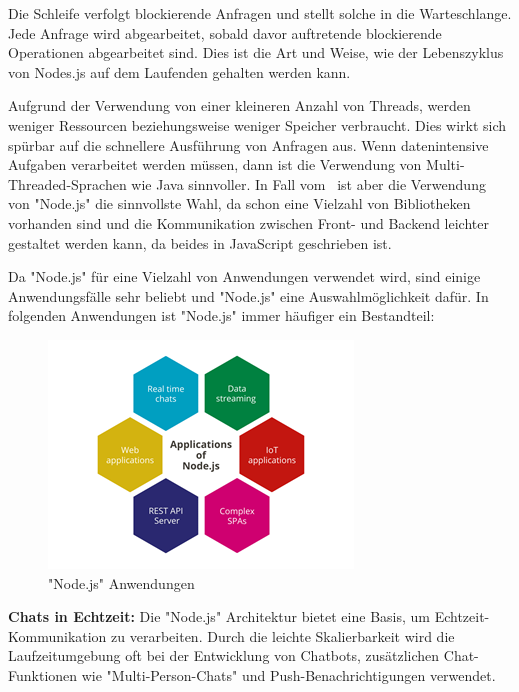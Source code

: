 Die Schleife verfolgt blockierende Anfragen und stellt solche in die Warteschlange. Jede Anfrage wird abgearbeitet, sobald davor auftretende blockierende Operationen abgearbeitet sind. Dies ist die Art und Weise, wie der Lebenszyklus von Nodes.js auf dem Laufenden gehalten werden kann. \cite{NodeJsArch} \cite{NodeJsArch2}

Aufgrund der Verwendung von einer kleineren Anzahl von Threads, werden weniger Ressourcen beziehungsweise weniger Speicher verbraucht. Dies wirkt sich spürbar auf die schnellere Ausführung von Anfragen aus. Wenn datenintensive Aufgaben verarbeitet werden müssen, dann ist die Verwendung von Multi-Threaded-Sprachen wie Java sinnvoller. In Fall vom \ZELIA\ ist aber die Verwendung von "Node.js" die sinnvollste Wahl, da schon eine Vielzahl von Bibliotheken vorhanden sind und die Kommunikation zwischen Front- und Backend leichter gestaltet werden kann, da beides in JavaScript geschrieben ist. \cite{Arocom} \cite{NodeJsArch2} \cite{NodeJsArch}


Da "Node.js" für eine Vielzahl von Anwendungen verwendet wird, sind einige Anwendungsfälle sehr beliebt und "Node.js" eine Auswahlmöglichkeit dafür. In folgenden Anwendungen ist "Node.js" immer häufiger ein Bestandteil:

\begin{figure}[H]
    \centering
    \includegraphics{media/NodeJs/NodeJsAnwendungen.png}
    \caption{"Node.js" Anwendungen \cite{AnwendungenFoto}}
\end{figure}

    \textbf{Chats in Echtzeit:}
    Die "Node.js" Architektur bietet eine Basis, um Echtzeit-Kom\-muni\-kati\-on zu verarbeiten. Durch die leichte Skalierbarkeit wird die Laufzeitumgebung oft bei der Entwicklung von Chatbots, zusätzlichen Chat-Funktionen wie "Multi-Person-Chats" und Push-Benachrichtigungen verwendet.

